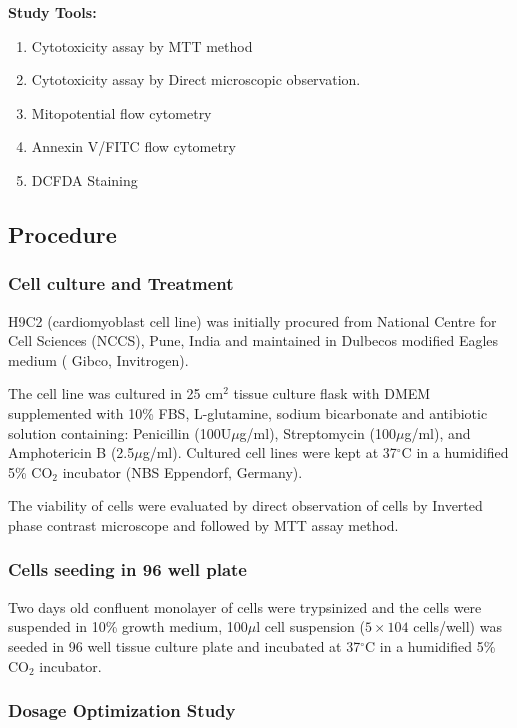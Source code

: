 \documentclass[11pt]{article} %
\begin{document}
\textbf{Study Tools:}

\begin{enumerate}
	\item Cytotoxicity assay by MTT method
	\item Cytotoxicity assay by Direct microscopic observation.
	\item Mitopotential flow cytometry
	\item Annexin V/FITC flow cytometry
	\item DCFDA Staining
\end{enumerate}

\subsection{Procedure}
\label{subsec:Procedure}

\subsubsection{Cell culture and Treatment}
\label{subsubsec:Cell culture and Treatment}

H9C2 (cardiomyoblast cell line) was initially procured from National Centre for Cell Sciences (NCCS), Pune, India and maintained in Dulbecos modified Eagles medium ( Gibco, Invitrogen).

The  cell line was  cultured in 25 cm$^2 $ tissue culture flask with DMEM supplemented with 10\% FBS, L-glutamine, sodium bicarbonate and antibiotic solution containing: Penicillin (100U$\mu$g/ml), Streptomycin (100$\mu$g/ml), and Amphotericin B (2.5$\mu$g/ml). Cultured cell lines were kept at 37$^{\circ}$C in a humidified 5\% CO$_2$ incubator (NBS Eppendorf, Germany). 

The viability of cells were evaluated by direct observation of cells by Inverted phase contrast microscope and followed by MTT assay method.

\subsubsection{Cells seeding in 96 well plate}
\label{subsubsec:Cells seeding in 96 well plate}

Two days old confluent monolayer of cells were trypsinized and the cells were suspended in 10\% growth medium, 100$\mu$l cell suspension ($ 5\times104 $ cells/well) was seeded in 96 well tissue culture plate and incubated at 37$^{\circ}$C in a humidified 5\% CO$_2$ incubator. 

\subsubsection{Dosage Optimization Study}
\label{subsub:Dosage Optimization Study}
\end{document}
